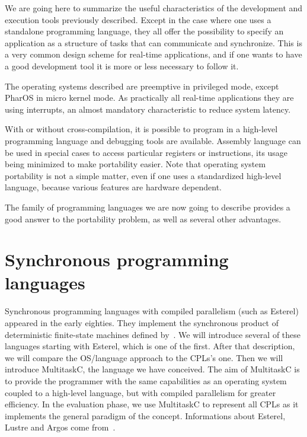 \documentclass[10pt]{report}
\begin{document}
We are going here to summarize the useful characteristics of the development and execution tools previously described. Except
in the case where one uses a standalone programming language, they all offer the possibility to specify an application as a structure of tasks
that can communicate and synchronize. This is a very common design scheme for real-time applications, and if one wants to have a good 
development tool it is more or less necessary to follow it.

The operating systems described are preemptive in privileged mode, except PharOS in micro kernel mode. As practically all
real-time applications they are using interrupts, an almost mandatory characteristic to reduce system latency.

With or without cross-compilation, it is possible to program in a high-level programming language and debugging tools are available. 
Assembly language can be used in special cases to access particular registers or instructions, its usage being minimized to make 
portability easier. Note that operating system portability is not a simple matter, even if one uses a standardized high-level language, because 
various features are hardware dependent.

The family of programming languages we are now going to describe provides a good answer to the portability problem, as well as several other advantages.

\section{Synchronous programming languages}

Synchronous programming languages with compiled parallelism (such as Esterel) appeared in the early eighties. They implement the synchronous product
of deterministic finite-state machines defined by~\cite{ArnoldNivat:82}. We will introduce several of these languages starting with
Esterel, which is one of the first. After that description, we will compare the OS/language approach to the CPLs's one. Then we will introduce MultitaskC, 
the language we have conceived. The aim of MultitaskC is to provide the programmer with the same capabilities as an operating system coupled to a high-level 
language, but with compiled parallelism for greater efficiency. In the evaluation phase, we use MultitaskC to represent all CPLs as it 
implements the general paradigm of the concept. Informations about Esterel, Lustre and Argos come from~\cite{Halbwachs:91}.
\end{document}
